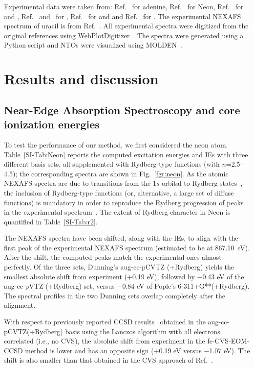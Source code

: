 \documentclass[journal=jctcce,manuscript=article]{achemso}
\begin{document}
Experimental data were taken from:  Ref.~
for adenine, Ref.~ for Neon,
Ref.~ for  and ,
Ref.~ and~ for ,
Ref.~ for  and  and Ref.~ for .
The experimental NEXAFS spectrum of uracil is from Ref.~.
All experimental spectra were digitized from the 
original references using WebPlotDigitizer~\cite{WPD}. 
The spectra were generated using a Python script and NTOs were visualized using MOLDEN~\cite{molden}.

\section{Results and discussion}
\subsection{Near-Edge Absorption Spectroscopy and core ionization energies}

To test the performance of our method, we first considered the neon atom.  Table~\ref{SI-Tab:Neon} reports the computed excitation energies and IEs with three different basis sets, all supplemented with Rydberg-type functions (with $n$=2.5--4.5); the corresponding spectra are shown in Fig.~\ref{fgr:neon}. 
As the atomic NEXAFS spectra are due to transitions from the 1$s$ orbital to Rydberg states~\cite{Stohr1992}, the inclusion of Rydberg-type functions (or, alternative, a large set of diffuse functions) is mandatory in order to reproduce the Rydberg progression of peaks in the experimental spectrum~\cite{coriani2012pra}. The extent of Rydberg character in Neon is quantified in Table~\ref{SI-Tab:r2}.

The NEXAFS spectra have been shifted, along with the IEs, to align with the first peak of the experimental NEXAFS spectrum (estimated to be at 867.10~eV). After the shift, the computed peaks match the  experimental ones almost perfectly. Of the three sets, Dunning's aug-cc-pCVTZ (+Rydberg) yields the smallest absolute shift from experiment (+0.19 eV), followed by $-$0.43 eV of the aug-cc-pVTZ (+Rydberg) set, versus $-$0.84 eV of Pople's  6-311+G**(+Rydberg). The spectral profiles in the two Dunning sets overlap completely after the alignment. 

With respect to previously reported CCSD results~\cite{coriani2012pra} obtained in the aug-cc-pCVTZ(+Rydberg) basis using the Lanczos algorithm with all electrons correlated (i.e., no CVS), the absolute shift from experiment in the fc-CVS-EOM-CCSD method is lower and has an opposite sign ($+$0.19 eV versus $-$1.07 eV). The shift is also smaller than that obtained in the CVS approach of Ref.~. 
\end{document}
